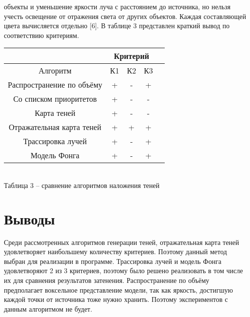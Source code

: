 {{        объекты и уменьшение яркости луча с расстоянием до источника,
        но нельзя учесть освещение от отражения света от других объектов.
        Каждая составляющей цвета вычисляется отдельно [6].
    }
    В таблице 3 представлен краткий вывод по соответствию критериям.
    \begin{center}
        \begin{tabular} { |c|c|c|c|c| }
            \hline
            \hspace{0pt} & \multicolumn{3}{|c|}{Критерий} \\
            \hline
            Алгоритм & К1 & К2 & К3 \\
            \hline
            Распространение по объёму & + & - & + \\
            \hline
            Со списком приоритетов & + & - & -  \\
            \hline
            Карта теней & + & - & - \\
            \hline
            Отражательная карта теней & + & + & + \\
            \hline
            Трассировка лучей & + & - & + \\
            \hline
            Модель Фонга & + & - & + \\
            \hline
        \end{tabular}
        \\
        \vspace{2mm}
        \small { Таблица 3 -- сравнение алгоритмов наложения теней }
    \end{center}
    
    \section*{Выводы} {
        Среди рассмотренных алгоритмов генерации теней, отражательная карта теней
        удовлетворяет наибольшему количеству критериев.
        Поэтому данный метод выбран для реализации в программе.
        Трассировка лучей и модель Фонга удовлетворяют 2 из 3 критериев, поэтому
        было решено реализовать в том числе их для сравнения результатов
        затенения.
        Распространение по объёму предполагает воксельное представление модели,
        так как яркость, достигшую каждой точки от источника тоже нужно хранить.
        Поэтому экспериментов с данным алгоритмом не будет.
    }
}